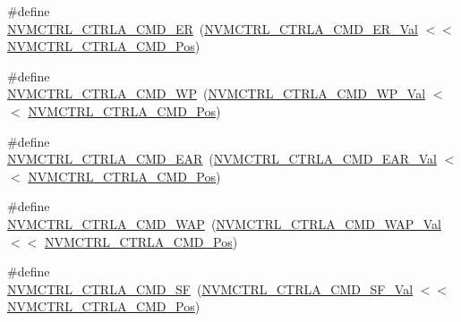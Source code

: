 \begin{DoxyCompactItemize}
\#define \mbox{\hyperlink{group___s_a_m_d21___n_v_m_c_t_r_l_gaaecf1953d86bef9ad9bef7309493954d}{N\+V\+M\+C\+T\+R\+L\+\_\+\+C\+T\+R\+L\+A\+\_\+\+C\+M\+D\+\_\+\+ER}}~(\mbox{\hyperlink{group___s_a_m_d21___n_v_m_c_t_r_l_ga6c7936d9e4cd317170b54ffb5b3b428d}{N\+V\+M\+C\+T\+R\+L\+\_\+\+C\+T\+R\+L\+A\+\_\+\+C\+M\+D\+\_\+\+E\+R\+\_\+\+Val}}      $<$$<$ \mbox{\hyperlink{group___s_a_m_d21___n_v_m_c_t_r_l_ga5346c6f8ba695f7cadb7f07bde6e25f8}{N\+V\+M\+C\+T\+R\+L\+\_\+\+C\+T\+R\+L\+A\+\_\+\+C\+M\+D\+\_\+\+Pos}})
\item 
\#define \mbox{\hyperlink{group___s_a_m_d21___n_v_m_c_t_r_l_gad21e753f2741af430e0a52f2a9a15eab}{N\+V\+M\+C\+T\+R\+L\+\_\+\+C\+T\+R\+L\+A\+\_\+\+C\+M\+D\+\_\+\+WP}}~(\mbox{\hyperlink{group___s_a_m_d21___n_v_m_c_t_r_l_gad7cfc5fc0cd04b2bbe3337a035b6d127}{N\+V\+M\+C\+T\+R\+L\+\_\+\+C\+T\+R\+L\+A\+\_\+\+C\+M\+D\+\_\+\+W\+P\+\_\+\+Val}}      $<$$<$ \mbox{\hyperlink{group___s_a_m_d21___n_v_m_c_t_r_l_ga5346c6f8ba695f7cadb7f07bde6e25f8}{N\+V\+M\+C\+T\+R\+L\+\_\+\+C\+T\+R\+L\+A\+\_\+\+C\+M\+D\+\_\+\+Pos}})
\item 
\#define \mbox{\hyperlink{group___s_a_m_d21___n_v_m_c_t_r_l_gac046ff781ead0748e07c007c15e41ad7}{N\+V\+M\+C\+T\+R\+L\+\_\+\+C\+T\+R\+L\+A\+\_\+\+C\+M\+D\+\_\+\+E\+AR}}~(\mbox{\hyperlink{group___s_a_m_d21___n_v_m_c_t_r_l_ga07c4451d3f3e0d0dbed551ef0c3bbd21}{N\+V\+M\+C\+T\+R\+L\+\_\+\+C\+T\+R\+L\+A\+\_\+\+C\+M\+D\+\_\+\+E\+A\+R\+\_\+\+Val}}     $<$$<$ \mbox{\hyperlink{group___s_a_m_d21___n_v_m_c_t_r_l_ga5346c6f8ba695f7cadb7f07bde6e25f8}{N\+V\+M\+C\+T\+R\+L\+\_\+\+C\+T\+R\+L\+A\+\_\+\+C\+M\+D\+\_\+\+Pos}})
\item 
\#define \mbox{\hyperlink{group___s_a_m_d21___n_v_m_c_t_r_l_ga2ce3d94a5f09832706179f27bbe94d71}{N\+V\+M\+C\+T\+R\+L\+\_\+\+C\+T\+R\+L\+A\+\_\+\+C\+M\+D\+\_\+\+W\+AP}}~(\mbox{\hyperlink{group___s_a_m_d21___n_v_m_c_t_r_l_ga16088beab7d82fdbb34bac9971d21859}{N\+V\+M\+C\+T\+R\+L\+\_\+\+C\+T\+R\+L\+A\+\_\+\+C\+M\+D\+\_\+\+W\+A\+P\+\_\+\+Val}}     $<$$<$ \mbox{\hyperlink{group___s_a_m_d21___n_v_m_c_t_r_l_ga5346c6f8ba695f7cadb7f07bde6e25f8}{N\+V\+M\+C\+T\+R\+L\+\_\+\+C\+T\+R\+L\+A\+\_\+\+C\+M\+D\+\_\+\+Pos}})
\item 
\#define \mbox{\hyperlink{group___s_a_m_d21___n_v_m_c_t_r_l_ga98dcae15125d4efee881b3964b7d23a1}{N\+V\+M\+C\+T\+R\+L\+\_\+\+C\+T\+R\+L\+A\+\_\+\+C\+M\+D\+\_\+\+SF}}~(\mbox{\hyperlink{group___s_a_m_d21___n_v_m_c_t_r_l_ga37bc89b225c1b5d5a07bc707ef910ecb}{N\+V\+M\+C\+T\+R\+L\+\_\+\+C\+T\+R\+L\+A\+\_\+\+C\+M\+D\+\_\+\+S\+F\+\_\+\+Val}}      $<$$<$ \mbox{\hyperlink{group___s_a_m_d21___n_v_m_c_t_r_l_ga5346c6f8ba695f7cadb7f07bde6e25f8}{N\+V\+M\+C\+T\+R\+L\+\_\+\+C\+T\+R\+L\+A\+\_\+\+C\+M\+D\+\_\+\+Pos}})
$$
\end{DoxyCompactItemize}
